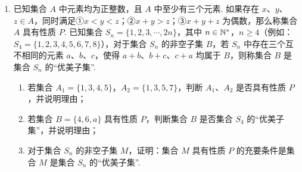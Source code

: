 \documentclass[a4paper,11pt]{article}
\begin{document}
\begin{enumerate}
\begin{enumerate}[label=(\arabic*)]
\item 求 $a$、$b$、$c$ 的值，并写出年利润 $L(x)$（万元）关于年产量的 $x$（千件）的函数解析式；
\item 当年产量为多少千件时，该厂所获年利润最大？并求出最大年利润.
\end{enumerate}

\ifanswer
\solbegin
{}
\solend
\fi

\ansspace[8]

\ansneed{20cm}
\item 已知集合 $A$ 中元素均为正整数，且 $A$ 中至少有三个元素. 如果存在 $x$、$y$、$z\in A$，同时满足①$x<y<z$；②$x+y>z$；③$x+y+z$ 为偶数，那么称集合 $A$ 具有性质 $P$. 已知集合 $S_n=\{1,2,3,\cdots,2n\}$，其中 $n\in\mathbb{N}^*$，$n\geqslant4$（例如：$S_4=\{1,2,3,4,5,6,7,8\}$），对于集合 $S_n$ 的非空子集 $B$，若 $S_n$ 中存在三个互不相同的元素 $a$、$b$、$c$，使得 $a+b$、$b+c$、$c+a$ 均属于 $B$，则称集合 $B$ 是集合 $S_n$ 的“优美子集”.

\begin{enumerate}[label=(\arabic*)]
\item 若集合 $A_1=\{1,3,4,5\}$，$A_2=\{1,3,5,7\}$，判断 $A_1$、$A_2$ 是否具有性质 $P$，并说明理由；
\item 若集合 $B=\{4,6,a\}$ 具有性质 $P$，判断集合 $B$ 是否集合 $S_4$ 的“优美子集”，并说明理由；
\item 对于集合 $S_n$ 的非空子集 $M$，证明：集合 $M$ 具有性质 $P$ 的充要条件是集合 $M$ 是集合 $S_n$ 的“优美子集”.
\end{enumerate}


\end{enumerate}
\end{document}
